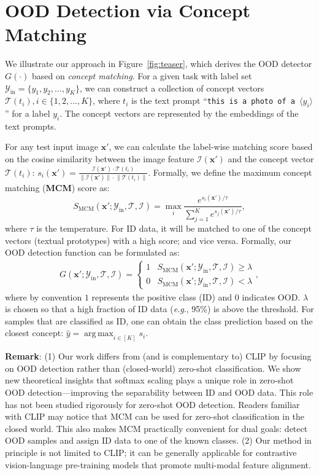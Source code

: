 \documentclass{article}
\def\*#1{\mathbf{#1}}
\DeclareMathOperator*{\argmax}{arg\,max}
\def\eg{\emph{e.g}., }
\begin{document}
\section{OOD Detection via Concept Matching}
\label{sec:method}
We illustrate our approach in Figure~\ref{fig:teaser}, which derives the OOD detector $G(\cdot)$ based on \emph{concept matching}. For a given task with label set $\mathcal{Y}_\text{in}=\{y_1, y_2,...,y_K\}$, we can construct a collection of concept vectors $\mathcal{T}(t_i), i\in \{1,2,...,K\}$, where $t_i$ is the text prompt
``\texttt{this is a photo of a $\langle y_i \rangle$}''
for a label $y_i$.
The concept vectors are represented by the embeddings of the text prompts.

For any test input image $\*x'$, we can calculate the label-wise matching score based on the cosine similarity between the image feature $\mathcal{I}(\*x')$ and the concept vector $\mathcal{T}(t_i)$: $s_i(\*x') = \frac{\mathcal{I}(\*x') \cdot \mathcal{T}(t_i)}{\lVert \mathcal{I}(\*x')\rVert \cdot \lVert \mathcal{T}(t_i) \rVert}$.
Formally,
we define the maximum concept matching (\textbf{MCM}) score as:
\begin{equation}
    S_{\text{MCM}}(\*x';\mathcal{Y}_\text{in},\mathcal{T},\mathcal{I}) = \max_i \frac{e^{s_i(\*x')/\tau}}{\sum_{j=1}^K e^{s_j(\*x')/\tau}},
\end{equation}
where $\tau$ is the temperature. For ID data, it will be matched to one of the concept vectors (textual prototypes) with a high score; and vice versa.
Formally, our OOD detection function can be formulated as:
 \begin{align*}
\label{eq:threshold}
	G(\*x';\mathcal{Y}_\text{in},\mathcal{T},\mathcal{I}) =\begin{cases} 
      1 & S_{\text{MCM}}(\*x';\mathcal{Y}_\text{in},\mathcal{T},\mathcal{I})\ge \lambda \\
      0 & S_{\text{MCM}}(\*x';\mathcal{Y}_\text{in},\mathcal{T},\mathcal{I}) < \lambda 
  \end{cases},
\end{align*}
where by convention $1$ represents the positive class (ID) and $0$ indicates OOD. $\lambda$ is chosen so that a high fraction of ID data (\eg 95\%) is above the threshold. For samples that are classified as ID, one can obtain the class prediction based on the closest concept:
$\hat y = \argmax_{i\in[K]} s_i$. 

\textbf{Remark}: (1) Our work differs from (and is complementary to) CLIP by focusing on OOD detection rather than (closed-world) zero-shot classification. We show new theoretical insights that softmax scaling plays a unique role in zero-shot OOD detection---improving the separability between ID and OOD data. This role has not been studied rigorously for zero-shot OOD detection. Readers familiar with CLIP may notice that MCM can be used for zero-shot classification in the closed world. This also makes MCM practically convenient for dual goals: detect OOD samples and assign ID data to one of the known classes. (2) Our method in principle is not limited to CLIP; it can be generally applicable for contrastive vision-language pre-training models that promote multi-modal feature alignment. 
\end{document}
